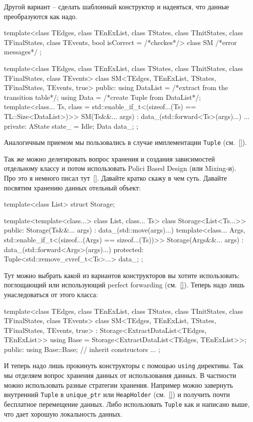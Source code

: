 \documentclass{article}
\begin{document}
{Другой вариант -- сделать шаблонный конструктор и надеяться, что данные преобразуются как надо.
\begin{cppcode}
template<class TEdges, class TEnExList, class TStates, class TInitStates,
         class TFinalStates, class TEvents, bool isCorrect = /*checkes*/>
class SM { /*error messages*/ };

template<class TEdges, class TEnExList, class TStates, class TInitStates,
         class TFinalStates, class TEvents>
class SM<TEdges, TEnExList, TStates, TFinalStates, TEvents, true> {
public:
  using DataList = /*extract from the transition table*/;
  using Data = /*create Tuple from DataList*/;
  template<class... Ts, class = std::enable_if_t<(sizeof...(Ts) == TL::Size<DataList>)>>
  SM(Ts&&... args) : data_(std::forward<Ts>(args)...) {}
  ...
private:
  AState state_ = Idle{};
  Data data_;
};
\end{cppcode}
Аналогичным приемом мы пользовались в случае имплементации \verb"Tuple" (см.~\ref{}).

Так же можно делегировать вопрос хранения и создания зависимостей отдельному классу и потом использовать Polici Based Design (или Mixing-и).
Про это я немного писал тут~\ref{}.
Давайте кратко скажу в чем суть.
Давайте посвятим хранению данных отельный объект:
\begin{cppcode}
template<class List>
struct Storage;

template<template<class...> class List, class... Ts>
class Storage<List<Ts...>> {
public:
  Storage(Ts&&... args) : data_(std::move(args)...) {}
  template<class... Args, std::enable_if_t<(sizeof...(Args) == sizeof...(Ts))>>
  Storage(Args&&... args) : data_(std::forward<Args>(args)...) {}
protected:
  Tuple<std::remove_cvref_t<Ts>...> data_;
};
\end{cppcode}
Тут можно выбрать какой из вариантов конструкторов вы хотите использовать: поглощающий или использующий perfect forwarding (см.~\ref{}).
Теперь надо лишь унаследоваться от этого класса:
\begin{cppcode}
template<class TEdges, class TEnExList, class TStates, class TInitStates,
         class TFinalStates, class TEvents>
class SM<TEdges, TEnExList, TStates, TFinalStates, TEvents, true>
    : Storage<ExtractDataList<TEdges, TEnExList>>  {
  using Base = Storage<ExtractDataList<TEdges, TEnExList>>;
public:
  using Base::Base; // inherit constructors
  ...
};
\end{cppcode}
И теперь надо лишь прокинуть конструкторы с помощью \verb"using" директивы.
Так мы отделяем вопрос хранения данных от использования данных.
В частности можно использовать разные стратегии хранения.
Например можно завернуть внутренний \verb"Tuple" в \verb"unique_ptr" или \verb"HeapHolder" (см.~\ref{}) и получить почти бесплатное перемещение данных.
Либо использовать \verb"Tuple" как и написано выше, что дает хорошую локальность данных.

}
\end{document}
